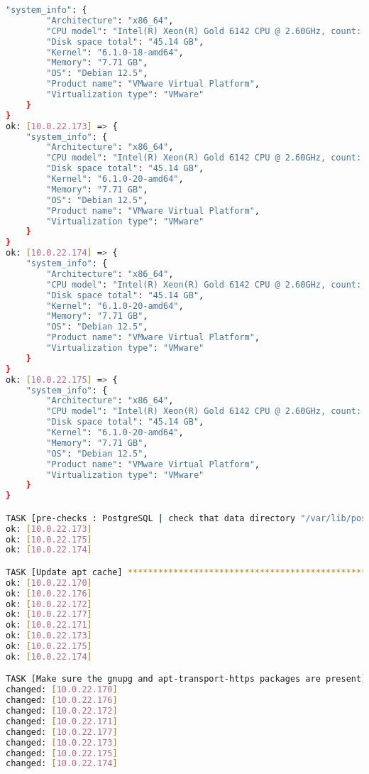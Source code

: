 \begin{flushleft}
\begin{lstlisting}[language=bash, caption=Deploy - Anhang - Deployt,captionpos=b,label={lst:deploy-appendix-deployt},breaklines=true]
    "system_info": {
        "Architecture": "x86_64",
        "CPU model": "Intel(R) Xeon(R) Gold 6142 CPU @ 2.60GHz, count: 4, cores: 1",
        "Disk space total": "45.14 GB",
        "Kernel": "6.1.0-18-amd64",
        "Memory": "7.71 GB",
        "OS": "Debian 12.5",
        "Product name": "VMware Virtual Platform",
        "Virtualization type": "VMware"
    }
}
ok: [10.0.22.173] => {
    "system_info": {
        "Architecture": "x86_64",
        "CPU model": "Intel(R) Xeon(R) Gold 6142 CPU @ 2.60GHz, count: 8, cores: 1",
        "Disk space total": "45.14 GB",
        "Kernel": "6.1.0-20-amd64",
        "Memory": "7.71 GB",
        "OS": "Debian 12.5",
        "Product name": "VMware Virtual Platform",
        "Virtualization type": "VMware"
    }
}
ok: [10.0.22.174] => {
    "system_info": {
        "Architecture": "x86_64",
        "CPU model": "Intel(R) Xeon(R) Gold 6142 CPU @ 2.60GHz, count: 8, cores: 1",
        "Disk space total": "45.14 GB",
        "Kernel": "6.1.0-20-amd64",
        "Memory": "7.71 GB",
        "OS": "Debian 12.5",
        "Product name": "VMware Virtual Platform",
        "Virtualization type": "VMware"
    }
}
ok: [10.0.22.175] => {
    "system_info": {
        "Architecture": "x86_64",
        "CPU model": "Intel(R) Xeon(R) Gold 6142 CPU @ 2.60GHz, count: 8, cores: 1",
        "Disk space total": "45.14 GB",
        "Kernel": "6.1.0-20-amd64",
        "Memory": "7.71 GB",
        "OS": "Debian 12.5",
        "Product name": "VMware Virtual Platform",
        "Virtualization type": "VMware"
    }
}

TASK [pre-checks : PostgreSQL | check that data directory "/var/lib/postgresql/16/main" is not initialized] *******************************************************************************************************
ok: [10.0.22.173]
ok: [10.0.22.175]
ok: [10.0.22.174]

TASK [Update apt cache] *******************************************************************************************************************************************************************************************
ok: [10.0.22.170]
ok: [10.0.22.176]
ok: [10.0.22.172]
ok: [10.0.22.177]
ok: [10.0.22.171]
ok: [10.0.22.173]
ok: [10.0.22.175]
ok: [10.0.22.174]

TASK [Make sure the gnupg and apt-transport-https packages are present] *******************************************************************************************************************************************
changed: [10.0.22.170]
changed: [10.0.22.176]
changed: [10.0.22.172]
changed: [10.0.22.171]
changed: [10.0.22.177]
changed: [10.0.22.173]
changed: [10.0.22.175]
changed: [10.0.22.174]


\end{lstlisting}
\end{flushleft}
